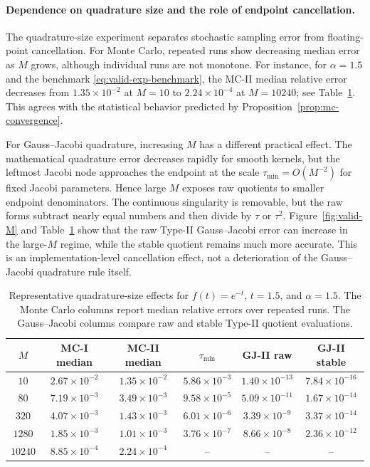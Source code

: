 \paragraph*{Dependence on quadrature size and the role of endpoint cancellation.}
The quadrature-size experiment separates stochastic sampling error from floating-point cancellation.  For Monte Carlo, repeated runs show decreasing median error as $M$ grows, although individual runs are not monotone.  For instance, for $\alpha=1.5$ and the benchmark \eqref{eq:valid-exp-benchmark}, the MC-II median relative error decreases from $1.35\times10^{-2}$ at $M=10$ to $2.24\times10^{-4}$ at $M=10240$; see Table~\ref{tab:valid-M-effect}.  This agrees with the statistical behavior predicted by Proposition~\ref{prop:mc-convergence}.

For Gauss--Jacobi quadrature, increasing $M$ has a different practical effect.  The mathematical quadrature error decreases rapidly for smooth kernels, but the leftmost Jacobi node approaches the endpoint at the scale $\tau_{\min}=O(M^{-2})$ for fixed Jacobi parameters.  Hence large $M$ exposes raw quotients to smaller endpoint denominators.  The continuous singularity is removable, but the raw forms subtract nearly equal numbers and then divide by $\tau$ or $\tau^2$.  Figure~\ref{fig:valid-M} and Table~\ref{tab:valid-M-effect} show that the raw Type-II Gauss--Jacobi error can increase in the large-$M$ regime, while the stable quotient remains much more accurate.  This is an implementation-level cancellation effect, not a deterioration of the Gauss--Jacobi quadrature rule itself.

\begin{table}[htbp]
\centering
\caption{Representative quadrature-size effects for $f(t)=e^{-t}$, $t=1.5$, and $\alpha=1.5$.  The Monte Carlo columns report median relative errors over repeated runs.  The Gauss--Jacobi columns compare raw and stable Type-II quotient evaluations.}
\label{tab:valid-M-effect}
\begin{tabular}{c|cc|ccc}
\hline
$M$ & MC-I median & MC-II median & $\tau_{\min}$ & GJ-II raw & GJ-II stable \\
\hline
$10$    & $2.67\times10^{-2}$ & $1.35\times10^{-2}$ & $5.86\times10^{-3}$ & $1.40\times10^{-13}$ & $7.84\times10^{-16}$ \\
$80$    & $7.19\times10^{-3}$ & $3.49\times10^{-3}$ & $9.58\times10^{-5}$ & $5.09\times10^{-11}$ & $1.67\times10^{-14}$ \\
$320$   & $4.07\times10^{-3}$ & $1.43\times10^{-3}$ & $6.01\times10^{-6}$ & $3.39\times10^{-9}$  & $3.37\times10^{-14}$ \\
$1280$  & $1.85\times10^{-3}$ & $1.01\times10^{-3}$ & $3.76\times10^{-7}$ & $8.66\times10^{-8}$  & $2.36\times10^{-12}$ \\
$10240$ & $8.85\times10^{-4}$ & $2.24\times10^{-4}$ & -- & -- & -- \\
\hline
\end{tabular}
\end{table}

